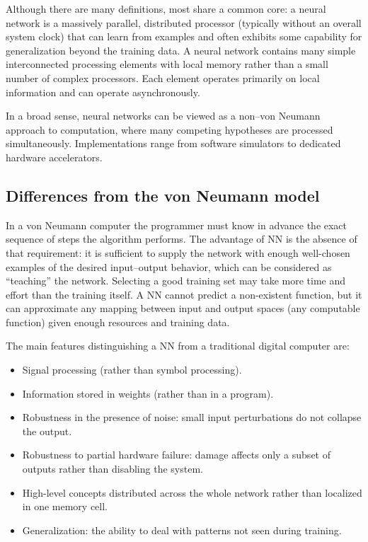 \documentclass[12pt]{article}
\begin{document}
Although there are many definitions, most share a common core: a neural network is a massively parallel, distributed processor (typically without an overall system clock) that can learn from examples and often exhibits some capability for generalization beyond the training data. A neural network contains many simple interconnected processing elements with local memory rather than a small number of complex processors. Each element operates primarily on local information and can operate asynchronously.

In a broad sense, neural networks can be viewed as a non--von Neumann approach to computation, where many competing hypotheses are processed simultaneously. Implementations range from software simulators to dedicated hardware accelerators.

\subsection{Differences from the von Neumann model}
In a von Neumann computer the programmer must know in advance the exact sequence of steps the algorithm performs. The advantage of NN is the absence of that requirement: it is sufficient to supply the network with enough well-chosen examples of the desired input--output behavior, which can be considered as ``teaching'' the network. Selecting a good training set may take more time and effort than the training itself. A NN cannot predict a non-existent function, but it can approximate any mapping between input and output spaces (any computable function) given enough resources and training data.

The main features distinguishing a NN from a traditional digital computer are:
\begin{itemize}[leftmargin=1.2em]
  \item Signal processing (rather than symbol processing).
  \item Information stored in weights (rather than in a program).
  \item Robustness in the presence of noise: small input perturbations do not collapse the output.
  \item Robustness to partial hardware failure: damage affects only a subset of outputs rather than disabling the system.
  \item High-level concepts distributed across the whole network rather than localized in one memory cell.
  \item Generalization: the ability to deal with patterns not seen during training.
\end{itemize}
\end{document}
